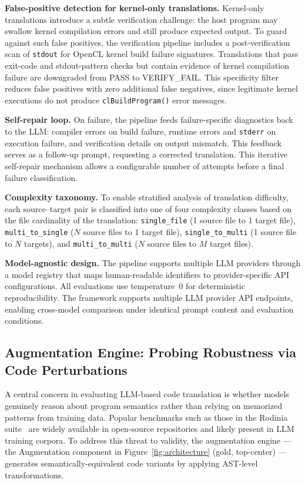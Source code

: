 \documentclass[conference]{IEEEtran}
\newcommand{\verifyfail}{\textsc{VERIFY\_FAIL}}
\begin{document}
\textbf{False-positive detection for kernel-only translations.} Kernel-only translations introduce a subtle verification challenge: the host program may swallow kernel compilation errors and still produce expected output. To guard against such false positives, the verification pipeline includes a post-verification scan of \texttt{stdout} for OpenCL kernel build failure signatures. Translations that pass exit-code and stdout-pattern checks but contain evidence of kernel compilation failure are downgraded from PASS to \verifyfail{}. This specificity filter reduces false positives with zero additional false negatives, since legitimate kernel executions do not produce \texttt{clBuildProgram()} error messages.

\textbf{Self-repair loop.} On failure, the pipeline feeds failure-specific diagnostics back to the LLM: compiler errors on build failure, runtime errors and \texttt{stderr} on execution failure, and verification details on output mismatch. This feedback serves as a follow-up prompt, requesting a corrected translation. This iterative self-repair mechanism allows a configurable number of attempts before a final failure classification.

\textbf{Complexity taxonomy.} To enable stratified analysis of translation difficulty, each source--target pair is classified into one of four complexity classes based on the file cardinality of the translation: \texttt{single\_file} (1 source file to 1 target file), \texttt{multi\_to\_single} ($N$ source files to 1 target file), \texttt{single\_to\_multi} (1 source file to $N$ targets), and \texttt{multi\_to\_multi} ($N$ source files to $M$ target files).

\textbf{Model-agnostic design.} The pipeline supports multiple LLM providers through a model registry that maps human-readable identifiers to provider-specific API configurations. All evaluations use temperature~0 for deterministic reproducibility. The framework supports multiple LLM provider API endpoints, enabling cross-model comparison under identical prompt content and evaluation conditions.


\subsection{Augmentation Engine: Probing Robustness via Code Perturbations}
\label{sec:augmentation-engine}

A central concern in evaluating LLM-based code translation is whether models genuinely reason about program semantics rather than relying on memorized patterns from training data. Popular benchmarks such as those in the Rodinia suite~\cite{Rodinia2009} are widely available in open-source repositories and likely present in LLM training corpora. To address this threat to validity, the augmentation engine ---the Augmentation component in Figure~\ref{fig:architecture} (gold, top-center) --- generates semantically-equivalent code variants by applying AST-level transformations.
\end{document}
